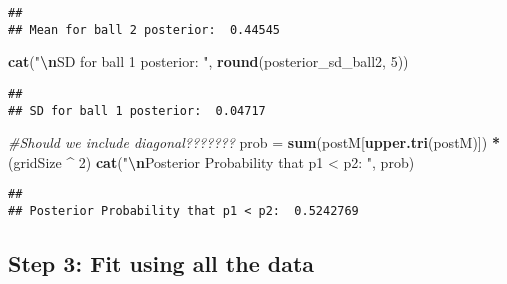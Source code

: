 \documentclass[
]{article}
\newenvironment{Shaded}{\begin{snugshade}}{\end{snugshade}}
\newcommand{\CommentTok}[1]{\textcolor[rgb]{0.56,0.35,0.01}{\textit{#1}}}
\newcommand{\DecValTok}[1]{\textcolor[rgb]{0.00,0.00,0.81}{#1}}
\newcommand{\FunctionTok}[1]{\textcolor[rgb]{0.13,0.29,0.53}{\textbf{#1}}}
\newcommand{\NormalTok}[1]{#1}
\newcommand{\OtherTok}[1]{\textcolor[rgb]{0.56,0.35,0.01}{#1}}
\newcommand{\SpecialCharTok}[1]{\textcolor[rgb]{0.81,0.36,0.00}{\textbf{#1}}}
\newcommand{\StringTok}[1]{\textcolor[rgb]{0.31,0.60,0.02}{#1}}
\begin{document}
\begin{verbatim}
## 
## Mean for ball 2 posterior:  0.44545
\end{verbatim}

\begin{Shaded}
\begin{Highlighting}[]
\FunctionTok{cat}\NormalTok{(}\StringTok{"}\SpecialCharTok{\textbackslash{}n}\StringTok{SD for ball 1 posterior: "}\NormalTok{, }\FunctionTok{round}\NormalTok{(posterior\_sd\_ball2, }\DecValTok{5}\NormalTok{))}
\end{Highlighting}
\end{Shaded}

\begin{verbatim}
## 
## SD for ball 1 posterior:  0.04717
\end{verbatim}

\begin{Shaded}
\begin{Highlighting}[]
\CommentTok{\#Should we include diagonal???????}
\NormalTok{prob }\OtherTok{=} \FunctionTok{sum}\NormalTok{(postM[}\FunctionTok{upper.tri}\NormalTok{(postM)]) }\SpecialCharTok{*}\NormalTok{ (gridSize }\SpecialCharTok{\^{}} \DecValTok{2}\NormalTok{) }
\FunctionTok{cat}\NormalTok{(}\StringTok{"}\SpecialCharTok{\textbackslash{}n}\StringTok{Posterior Probability that p1 \textless{} p2: "}\NormalTok{, prob)}
\end{Highlighting}
\end{Shaded}

\begin{verbatim}
## 
## Posterior Probability that p1 < p2:  0.5242769
\end{verbatim}

\hypertarget{step-3-fit-using-all-the-data}{%
\subsection{Step 3: Fit using all the
data}\label{step-3-fit-using-all-the-data}}
\end{document}

